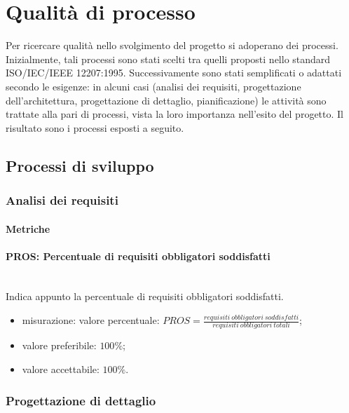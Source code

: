 \section{Qualità di processo}
Per ricercare qualità nello svolgimento del progetto si adoperano dei processi. Inizialmente, tali processi sono stati scelti tra quelli proposti nello standard ISO/IEC/IEEE 12207:1995. Successivamente sono stati semplificati o adattati secondo le esigenze: in alcuni casi (analisi dei requisiti, progettazione dell'architettura, progettazione di dettaglio, pianificazione) le attività sono trattate alla pari di processi, vista la loro importanza nell'esito del progetto.\newline 
Il risultato sono i processi esposti a seguito.

	\subsection{Processi di sviluppo}
	\subsubsection{Analisi dei requisiti}
		\paragraph{Metriche}
			\paragraph*{PROS: Percentuale di requisiti obbligatori soddisfatti}\mbox{}\\
			Indica appunto la percentuale di requisiti obbligatori soddisfatti.
			\begin{itemize}
				\item misurazione: valore percentuale: $ PROS = \frac{requisiti\ obbligatori\ soddisfatti}{requisiti\ obbligatori\ totali}$;
				\item valore preferibile: $100\%$;
				\item valore accettabile: $100\%$.
			\end{itemize}
			
	\subsubsection{Progettazione di dettaglio}
